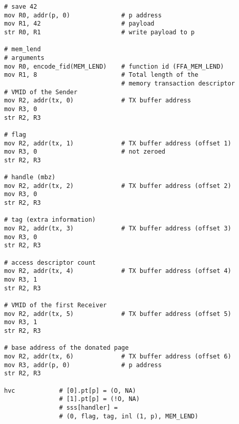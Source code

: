 \documentclass{article}
\begin{document}
\begin{figure}[hbt!]
\centering
{}
\end{figure}

\clearpage

\begin{lstlisting}[caption={VM 0}]
# save 42
mov R0, addr(p, 0)              # p address
mov R1, 42                      # payload
str R0, R1                      # write payload to p

# mem_lend
# arguments
mov R0, encode_fid(MEM_LEND)    # function id (FFA_MEM_LEND)
mov R1, 8                       # Total length of the  
                                # memory transaction descriptor
# VMID of the Sender 
mov R2, addr(tx, 0)             # TX buffer address                               
mov R3, 0
str R2, R3

# flag
mov R2, addr(tx, 1)             # TX buffer address (offset 1)                               
mov R3, 0                       # not zeroed
str R2, R3

# handle (mbz)
mov R2, addr(tx, 2)             # TX buffer address (offset 2)
mov R3, 0
str R2, R3

# tag (extra information)
mov R2, addr(tx, 3)             # TX buffer address (offset 3)
mov R3, 0
str R2, R3

# access descriptor count
mov R2, addr(tx, 4)             # TX buffer address (offset 4)
mov R3, 1
str R2, R3

# VMID of the first Receiver
mov R2, addr(tx, 5)             # TX buffer address (offset 5)
mov R3, 1
str R2, R3

# base address of the donated page
mov R2, addr(tx, 6)             # TX buffer address (offset 6)
mov R3, addr(p, 0)              # p address
str R2, R3

hvc            # [0].pt[p] = (O, NA)
               # [1].pt[p] = (!O, NA)
               # sss[handler] = 
               # (0, flag, tag, inl (1, p), MEM_LEND)


\end{lstlisting}
\end{document}
